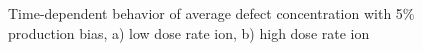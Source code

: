\documentclass[a4paper]{article}
\begin{document}
    \begin{figure}[h!]  %
      \centering
      \qquad
      \caption{Time-dependent behavior of average defect concentration  with 5\% production bias, a) low dose rate ion, b) high dose rate ion}
      \label{figure:average_concentrations_ion_5}
    \end{figure}
\end{document}
